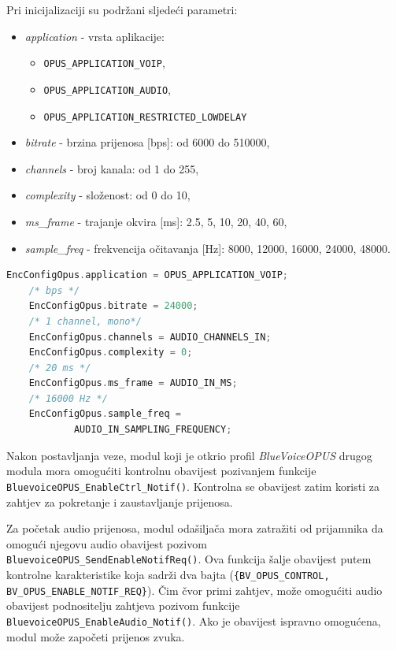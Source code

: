 Pri inicijalizaciji su podržani sljedeći parametri:
\begin{itemize}
	\item \textit{application} - vrsta aplikacije:
	\begin{itemize}
		\item \lstinline|OPUS_APPLICATION_VOIP|, 
		\item \lstinline|OPUS_APPLICATION_AUDIO|,
		\item  \lstinline|OPUS_APPLICATION_RESTRICTED_LOWDELAY|
	\end{itemize}
	\item \textit{bitrate} - brzina prijenosa [bps]: od 6000 do 510000,
	\item \textit{channels} - broj kanala: od 1 do 255,
	\item \textit{complexity} - složenost: od 0 do 10,
	\item \textit{ms\_frame} - trajanje okvira [ms]: 2.5, 5, 10, 20, 40, 60,
	\item \textit{sample\_freq} - frekvencija očitavanja [Hz]: 8000, 12000, 16000, 24000, 48000.
\end{itemize}

\begin{lstlisting}[caption={Parametri za Opus koder}, language=c]
	EncConfigOpus.application = OPUS_APPLICATION_VOIP;
	/* bps */
	EncConfigOpus.bitrate = 24000; 
	/* 1 channel, mono*/
	EncConfigOpus.channels = AUDIO_CHANNELS_IN; 
	EncConfigOpus.complexity = 0;
	/* 20 ms */
	EncConfigOpus.ms_frame = AUDIO_IN_MS; 
	/* 16000 Hz */
	EncConfigOpus.sample_freq = 
			AUDIO_IN_SAMPLING_FREQUENCY; 
\end{lstlisting}

Nakon postavljanja veze, modul koji je otkrio profil \textit{BlueVoiceOPUS} drugog modula mora omogućiti kontrolnu obavijest pozivanjem funkcije \newline \lstinline|BluevoiceOPUS_EnableCtrl_Notif()|. Kontrolna se obavijest zatim koristi za zahtjev za pokretanje i zaustavljanje prijenosa.

Za početak audio prijenosa, modul odašiljača mora zatražiti od prijamnika da omogući njegovu audio obavijest pozivom \lstinline|BluevoiceOPUS_SendEnableNotifReq()|. Ova funkcija šalje obavijest putem kontrolne karakteristike koja sadrži dva bajta (\lstinline|{BV_OPUS_CONTROL, BV_OPUS_ENABLE_NOTIF_REQ}|). Čim čvor primi zahtjev, može omogućiti audio obavijest podnositelju zahtjeva pozivom funkcije \newline \lstinline|BluevoiceOPUS_EnableAudio_Notif()|. Ako je obavijest ispravno omogućena, modul može započeti prijenos zvuka.

